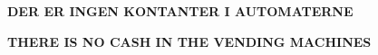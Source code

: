 \documentclass{article}
\begin{document}
\maketitle

\null

\vspace{2cm}

\begin{center}

{\fontsize{31}{31}\selectfont \textbf{DER ER INGEN KONTANTER I AUTOMATERNE}}

\vspace{2cm}

\english

{\fontsize{31}{31}\selectfont \textbf{THERE IS NO CASH IN THE VENDING MACHINES}}

\end{center}

\dansk

\underskriv
\end{document}
